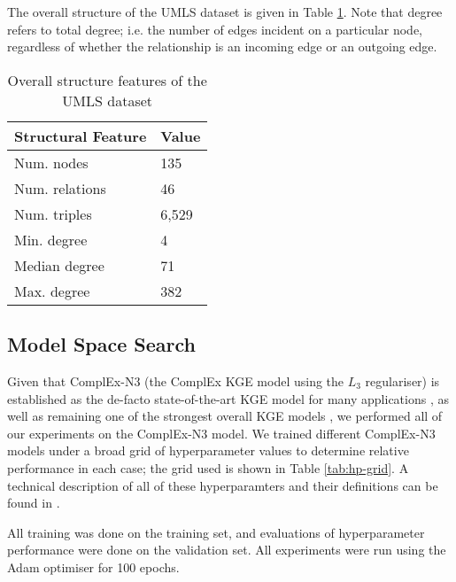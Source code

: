 The overall structure of the UMLS dataset is given in Table \ref{tab:umls}. Note that degree refers to total degree; i.e. the number of edges incident on a particular node, regardless of whether the relationship is an incoming edge or an outgoing edge.

\begin{table}
    \centering
    \begin{tabular}{l|l}
        \textbf{ Structural Feature}&\textbf{Value}\\ \hline
         Num. nodes& 135\\
         Num. relations& 46\\
         Num. triples& 6,529\\
         Min. degree& 4\\
         Median degree& 71\\
         Max. degree& 382\\
    \end{tabular}
    \caption{Overall structure features of the UMLS dataset}
    \label{tab:umls}
\end{table}

\subsection{Model Space Search}
Given that ComplEx-N3 (the ComplEx KGE model using the $L_3$ regulariser) is established as the de-facto state-of-the-art KGE model for many applications \cite{complex-n3}, as well as remaining one of the strongest overall KGE models \cite{baselines-strike-back-2,light-into-the-dark}, we performed all of our experiments on the ComplEx-N3 model. We trained different ComplEx-N3 models under a broad grid of hyperparameter values to determine relative performance in each case; the grid used is shown in Table \ref{tab:hp-grid}. A technical description of all of these hyperparamters and their definitions can be found in \cite{light-into-the-dark}.

All training was done on the training set, and evaluations of hyperparameter performance were done on the validation set. All experiments were run using the Adam optimiser for 100 epochs. 

